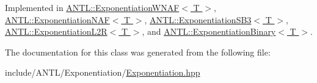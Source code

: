 Implemented in \hyperlink{classANTL_1_1ExponentiationWNAF_a63941859ba7c0118dadd33aa489a75c7}{A\-N\-T\-L\-::\-Exponentiation\-W\-N\-A\-F$<$ T $>$}, \hyperlink{classANTL_1_1ExponentiationNAF_ae8d97318323ee8b3a888080d75f2cc39}{A\-N\-T\-L\-::\-Exponentiation\-N\-A\-F$<$ T $>$}, \hyperlink{classANTL_1_1ExponentiationSB3_ab985adba341a35c9931aefbd6c8730f5}{A\-N\-T\-L\-::\-Exponentiation\-S\-B3$<$ T $>$}, \hyperlink{classANTL_1_1ExponentiationL2R_a51b38eebbc47e08a4b2ddd1b7f68b313}{A\-N\-T\-L\-::\-Exponentiation\-L2\-R$<$ T $>$}, and \hyperlink{classANTL_1_1ExponentiationBinary_a039ea9d52144229d0728d81060d43fc4}{A\-N\-T\-L\-::\-Exponentiation\-Binary$<$ T $>$}.



The documentation for this class was generated from the following file\-:\begin{DoxyCompactItemize}
\item 
include/\-A\-N\-T\-L/\-Exponentiation/\hyperlink{Exponentiation_8hpp}{Exponentiation.\-hpp}\end{DoxyCompactItemize}
